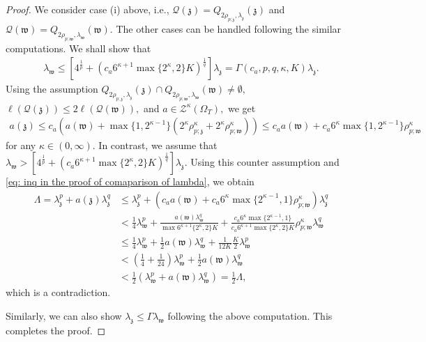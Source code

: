 \documentclass[notitlepage,11pt,reqno]{amsart}
\theoremstyle{definition}
\numberwithin{equation}{section}
\begin{document}
\begin{proof}
We consider case (i) above, i.e., $\mathcal{Q}(\mathfrak z)=Q_{2\rho_{p;\mathfrak z}, \lambda_{\mathfrak z}}(\mathfrak z)$ and $\mathcal{Q}(\mathfrak w)=Q_{2\rho_{p;\mathfrak w}, \lambda_\mathfrak w}(\mathfrak w).$ The other cases can be handled following the similar computations. We shall show that 
\begin{align*}
\lambda_{\mathfrak{w}}\leq \left[4^{\frac{1}{p}}+\left(c_a6^{\kappa+1}\max\{2^{\kappa}, 2\}K\right)^{\frac{1}{q}}\right]\lambda_{\mathfrak{z}}=\Gamma(c_a, p, q, \kappa, K)\lambda_{\mathfrak z}.
\end{align*}
Using the assumption $Q_{2\rho_{p;\mathfrak z}, \lambda_{\mathfrak z}}(\mathfrak z) \cap Q_{2\rho_{p;\mathfrak w}, \lambda_\mathfrak w}(\mathfrak w) \neq \emptyset,$ $ \ell(\mathcal{Q}(\mathfrak z))\leq 2 \ell(\mathcal{Q}(\mathfrak w)),$ and $a \in \mathcal{Z}^{\kappa}(\Omega_T),$ we get
\begin{align}\label{eq: inq in the proof of comaparison of lambda}
    a(\mathfrak z)\leq c_a \left(a(\mathfrak w)+\max\{1, 2^{\kappa-1}\}(2^{\kappa}\rho^{\kappa}_{p;\mathfrak z}+2^{\kappa}\rho^{\kappa}_{p;\mathfrak w})\right)\leq c_a a(\mathfrak w)+c_a 6^{\kappa}\max\{1, 2^{\kappa-1}\}\rho^{\kappa}_{p; \mathfrak w}
\end{align}
for any $\kappa \in (0, \infty).$
In contrast, we assume that $\lambda_{\mathfrak{w}}>\left[4^{\frac{1}{p}}+\left(c_a6^{\kappa+1}\max\{2^{\kappa}, 2\}K\right)^{\frac{1}{q}}\right]\lambda_{\mathfrak{z}}.$ Using this counter assumption and  \eqref{eq: inq in the proof of comaparison of lambda}, we obtain 
\begin{align*}
\Lambda=\lambda^p_{\mathfrak{z}}+a(\mathfrak{z})\lambda^q_{\mathfrak{z}} &\leq \lambda^p_{\mathfrak z} + \left(c_a a(\mathfrak w)+c_a 6^{\kappa}\max\{2^{\kappa-1}, 1\}\rho^{\kappa}_{p; \mathfrak w}\right)\lambda^q_{\mathfrak z} \\
&<\frac{1}{4}\lambda^p_{\mathfrak w}+\frac{a(\mathfrak w)\lambda^q_{\mathfrak w}}{\max6^{\kappa+1}\{2^{\kappa}, 2\}K}+ \frac{c_a6^{\kappa}\max\{2^{\kappa-1}, 1\}}{c_a 6^{\kappa+1}\max\{2^{\kappa}, 2\}K} \rho^{\kappa}_{p; \mathfrak w} \lambda^q_{\mathfrak w}\\
&\leq \frac{1}{4}\lambda^p_{\mathfrak w}+\frac{1}{2}a(\mathfrak w)\lambda^q_{\mathfrak w}+ \frac{1}{12K}\frac{K}{2}\lambda^p_{\mathfrak w}\\
&<\left(\frac{1}{4}+\frac{1}{24}\right)\lambda^p_{\mathfrak w}+\frac{1}{2}a(\mathfrak w)\lambda^q_{\mathfrak w}\\
&< \frac{1}{2}\left(\lambda^p_{\mathfrak w}+a(\mathfrak w)\lambda^q_{\mathfrak w}\right)=\frac{1}{2}\Lambda,
\end{align*}
which is a contradiction.

Similarly, we can also show $\lambda_{\mathfrak z}\leq \Gamma \lambda_{\mathfrak w}$ following the above computation. This completes the proof.
\end{proof}
\end{document}
